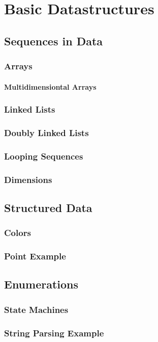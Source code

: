 \chapter{Basic Datastructures}

\section{Sequences in Data}

\subsection{Arrays}

\subsubsection{Multidimensiontal Arrays}

\subsection{Linked Lists}


\subsection{Doubly Linked Lists}

\subsection{Looping Sequences}

\subsection{Dimensions}

\section{Structured Data}

\subsection{Colors}

\subsection{Point Example}

\section{Enumerations}

\subsection{State Machines}

\subsection{String Parsing Example}

